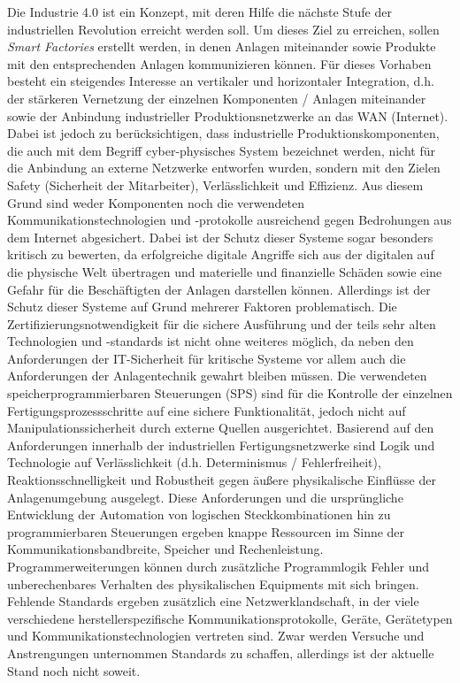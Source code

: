 Die Industrie 4.0 ist ein Konzept, mit deren Hilfe die nächste Stufe der industriellen Revolution erreicht werden soll. Um dieses Ziel zu erreichen, sollen \textit{Smart Factories} erstellt werden, in denen Anlagen miteinander sowie Produkte mit den entsprechenden Anlagen kommunizieren können. Für dieses Vorhaben besteht ein steigendes Interesse an vertikaler und horizontaler Integration, d.h. der stärkeren Vernetzung der einzelnen Komponenten / Anlagen miteinander sowie der Anbindung industrieller Produktionsnetzwerke an das WAN (Internet). 
Dabei ist jedoch zu berücksichtigen, dass industrielle Produktionskomponenten, die auch mit dem Begriff \glqq cyber-physisches System\grqq{} bezeichnet werden, nicht für die Anbindung an externe Netzwerke entworfen wurden, sondern mit den Zielen Safety (Sicherheit der Mitarbeiter), Verlässlichkeit und Effizienz. Aus diesem Grund sind weder Komponenten noch die verwendeten Kommunikationstechnologien und -protokolle ausreichend gegen Bedrohungen aus dem Internet abgesichert. Dabei ist der Schutz dieser Systeme sogar besonders kritisch zu bewerten, da erfolgreiche digitale Angriffe sich aus der digitalen auf die physische Welt übertragen und materielle und finanzielle Schäden sowie eine Gefahr für die Beschäftigten der Anlagen darstellen können. 
Allerdings ist der Schutz dieser Systeme auf Grund mehrerer Faktoren problematisch. Die Zertifizierungsnotwendigkeit für die sichere Ausführung und der teils sehr alten Technologien und -standards ist nicht ohne weiteres möglich, da neben den Anforderungen der IT-Sicherheit für kritische Systeme vor allem auch die Anforderungen der Anlagentechnik gewahrt bleiben müssen. Die verwendeten speicherprogrammierbaren Steuerungen (SPS) sind für die Kontrolle der einzelnen Fertigungsprozessschritte auf eine sichere Funktionalität, jedoch nicht auf Manipulationssicherheit durch externe Quellen ausgerichtet. Basierend auf den Anforderungen innerhalb der industriellen Fertigungsnetzwerke sind Logik und Technologie auf Verlässlichkeit (d.h. Determinismus / Fehlerfreiheit), Reaktionsschnelligkeit und Robustheit gegen äußere physikalische Einflüsse der Anlagenumgebung ausgelegt. Diese Anforderungen und die ursprüngliche Entwicklung der Automation von logischen Steckkombinationen hin zu programmierbaren Steuerungen ergeben knappe Ressourcen im Sinne der Kommunikationsbandbreite, Speicher und Rechenleistung. Programmerweiterungen können durch zusätzliche Programmlogik Fehler und unberechenbares Verhalten des physikalischen Equipments mit sich bringen. Fehlende Standards ergeben zusätzlich eine Netzwerklandschaft, in der viele verschiedene herstellerspezifische Kommunikationsprotokolle, Geräte, Gerätetypen und Kommunikationstechnologien vertreten sind. Zwar werden Versuche und Anstrengungen unternommen Standards zu schaffen, allerdings ist der aktuelle Stand noch nicht soweit.

